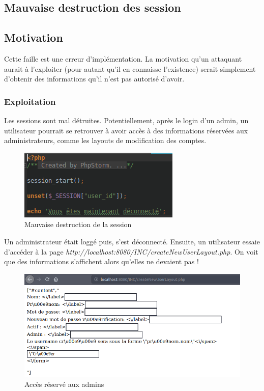 \documentclass[12pt]{article}
\begin{document}
\subsection{Mauvaise destruction des session}
\subsection{Motivation}
Cette faille est une erreur d'implémentation. La motivation qu'un attaquant aurait à l'exploiter (pour autant qu'il en connaisse l'existence) serait simplement d'obtenir des informations qu'il n'est pas autorisé d'avoir.
\subsubsection{Exploitation}
Les sessions sont mal détruites. Potentiellement, après le login d'un admin, un utilisateur pourrait se retrouver à avoir accès à des informations réservées aux administrateurs, comme les layouts de modification des comptes. 
\begin{figure}[H]
\centering
\includegraphics[width=\linewidth]{images/unset.png}
\caption{Mauvaise destruction de la session}
\end{figure}

Un administrateur était loggé puis, s'est déconnecté. Ensuite, un utilisateur essaie d'accéder à la page \textit{http://localhost:8080/INC/createNewUserLayout.php}. On voit que des informations s'affichent alors qu'elles ne devaient pas !
\begin{figure}[H]
\centering
\includegraphics[width=\linewidth]{images/exploitMauvaiseDestrucSess.png}
\caption{Accès réservé aux admins}
\end{figure}
\end{document}
